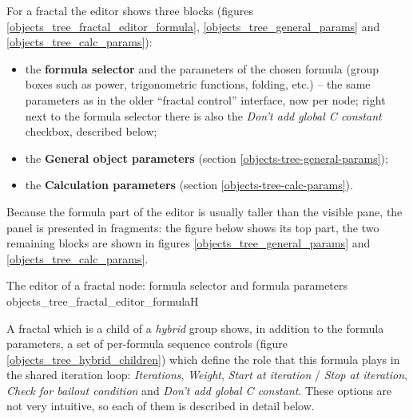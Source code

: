 For a fractal the editor shows three blocks (figures
\ref{objects_tree_fractal_editor_formula}, \ref{objects_tree_general_params} and
\ref{objects_tree_calc_params}):

\begin{itemize}
	\item the \textbf{formula selector} and the parameters of the chosen formula (group boxes such
	as power, trigonometric functions, folding, etc.) -- the same parameters as in the older
	``fractal control'' interface, now per node; right next to the formula selector there is also
	the \emph{Don't add global C constant} checkbox, described below;
	\item the \textbf{General object parameters} (section \ref{objects-tree-general-params});
	\item the \textbf{Calculation parameters} (section \ref{objects-tree-calc-params}).
\end{itemize}

Because the formula part of the editor is usually taller than the visible pane, the panel is
presented in fragments: the figure below shows its top part, the two remaining blocks are shown
in figures \ref{objects_tree_general_params} and \ref{objects_tree_calc_params}.

{The editor of a fractal node: formula selector and formula parameters}
{objects_tree_fractal_editor_formula}{H}

A fractal which is a child of a \emph{hybrid} group shows, in addition to the formula parameters,
a set of per-formula sequence controls (figure \ref{objects_tree_hybrid_children}) which define
the role that this formula plays in the shared iteration loop: \emph{Iterations}, \emph{Weight},
\emph{Start at iteration} / \emph{Stop at iteration}, \emph{Check for bailout condition} and
\emph{Don't add global C constant}. These options are not very intuitive, so each of them is
described in detail below.

